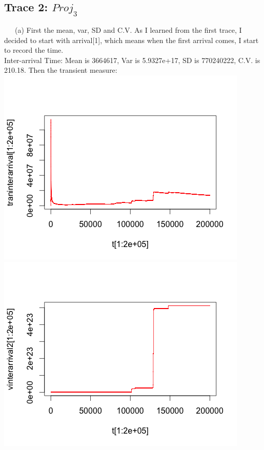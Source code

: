 \documentclass[11pt]{article}
\begin{document}
\subsection{\textbf{Trace 2: $Proj_3$}}
~~~(a) First the mean, var, SD and C.V. As I learned from the first trace, I decided to start with arrival[1], which means when the first arrival comes, I start to record the time. \\
Inter-arrival Time: Mean is 3664617, Var is 5.9327e+17, SD is 770240222, C.V. is 210.18. Then the transient measure:  \\
\includegraphics[scale=0.5]{traninterarrival2.png}
\includegraphics[scale=0.5]{vinterarrival2.png} \\
\end{document}
